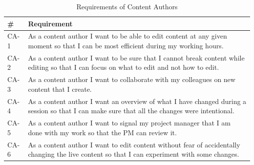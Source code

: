 
\begin{table}[h!]
\centering
\begin{tabular}{|l|p{12cm}|}
\hline
\rowcolor[HTML]{EFEFEF}
\textbf{\#} & \textbf{Requirement} \\ \hline
CA-1 & As a content author I want to be able to edit content at any given moment so that I can be most efficient during my working hours. \\ \hline
CA-2 & As a content author I want to be sure that I cannot break content while editing so that I can focus on what to edit and not how to edit. \\ \hline
CA-3 & As a content author I want to collaborate with my colleagues on new content that I create. \\ \hline
CA-4 & As a content author I want an overview of what I have changed during a session so that I can make sure that all the changes were intentional. \\ \hline
CA-5 & As a content author I want to signal my project manager that I am done with my work so that the PM can review it. \\ \hline
CA-6 & As a content author I want to edit content without fear of accidentally changing the live content so that I can experiment with some changes. \\ \hline
\end{tabular}
\caption{Requirements of Content Authors}
\label{req-content-authors}
\end{table}



